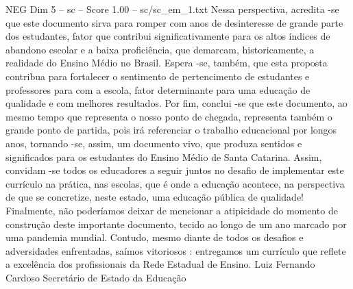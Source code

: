 \begin{textsample}{NEG Dim 5 – sc – Score 1.00 – sc/sc\_em\_1.txt}
Nessa perspectiva, acredita -se que este documento sirva para romper com anos de desinteresse de grande parte dos estudantes, fator que contribui significativamente para os altos índices de abandono escolar e a baixa proficiência, que demarcam, historicamente, a realidade do Ensino Médio no Brasil.
Espera -se, também, que esta proposta contribua para fortalecer o sentimento de pertencimento de estudantes e professores para com a escola, fator determinante para uma educação de qualidade e com melhores resultados.
Por fim, conclui -se que este documento, ao mesmo tempo que representa o nosso ponto de chegada, representa também o grande ponto de partida, pois irá referenciar o trabalho educacional por longos anos, tornando -se, assim, um documento vivo, que produza sentidos e significados para os estudantes do Ensino Médio de Santa Catarina.
Assim, convidam -se todos os educadores a seguir juntos no desafio de implementar este currículo na prática, nas escolas, que é onde a educação acontece, na perspectiva de que se concretize, neste estado, uma educação pública de qualidade!
Finalmente, não poderíamos deixar de mencionar a atipicidade do momento de construção deste importante documento, tecido ao longo de um ano marcado por uma pandemia mundial.
Contudo, mesmo diante de todos os desafios e adversidades enfrentadas, saímos vitoriosos : entregamos um currículo que reflete a excelência dos profissionais da Rede Estadual de Ensino.
Luiz Fernando Cardoso Secretário de Estado da Educação

\end{textsample}
